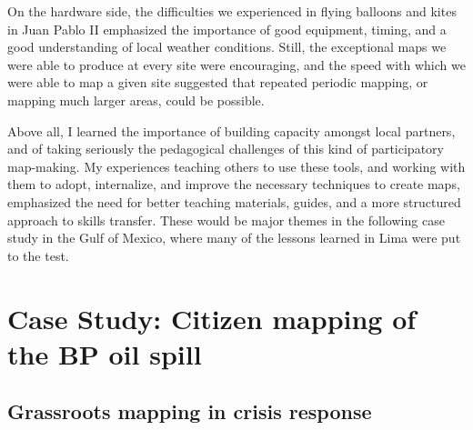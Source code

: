 \documentclass[11pt]{report}
\begin{document}
On the hardware side, the difficulties we experienced in flying balloons and kites in Juan Pablo II emphasized the importance of good equipment, timing, and a good understanding of local weather conditions. Still, the exceptional maps we were able to produce at every site were encouraging, and the speed with which we were able to map a given site suggested that repeated periodic mapping, or mapping much larger areas, could be possible. 

Above all, I learned the importance of building capacity amongst local partners, and of taking seriously the pedagogical challenges of this kind of participatory map-making. My experiences teaching others to use these tools, and working with them to adopt, internalize, and improve the necessary techniques to create maps, emphasized the need for better teaching materials, guides, and a more structured approach to skills transfer. These would be major themes in the following case study in the Gulf of Mexico, where many of the lessons learned in Lima were put to the test. 

\chapter{Case Study: Citizen mapping of the BP oil spill}
\label{chap:gulf}

\section{Grassroots mapping in crisis response}
\end{document}
